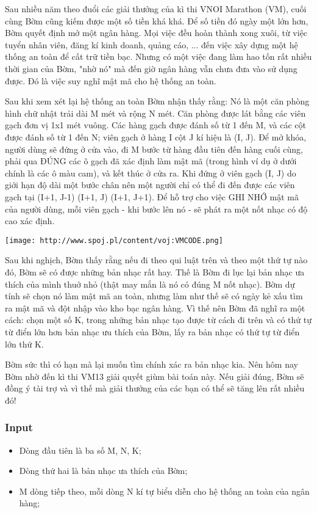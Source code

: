 



   Sau nhiều năm theo đuổi các giải thưởng của kì thi VNOI Marathon (VM), cuối cùng Bờm cũng kiếm được một số tiền khá khá. Để số tiền đó ngày một lớn hơn, Bờm quyết định mở một ngân hàng. Mọi việc đều hoàn thành xong xuôi, từ việc tuyển nhân viên, đăng kí kinh doanh, quảng cáo, ... đến việc xây dựng một hệ thống an toàn để cất trữ tiền bạc. Nhưng có một việc đang làm hao tốn rất nhiều thời gian của Bờm, "nhờ nó" mà đến giờ ngân hàng vẫn chưa đưa vào sử dụng được. Đó là việc suy nghĩ mật mã cho hệ thống an toàn.  

   Sau khi xem xét lại hệ thống an toàn Bờm nhận thấy rằng: Nó là một căn phòng hình chữ nhật trải dài M mét và rộng N mét. Căn phòng được lát bằng các viên gạch đơn vị 1x1 mét vuông. Các hàng gạch được đánh số từ 1 đến M, và các cột được đánh số từ 1 đến N; viên gạch ở hàng I cột J kí hiệu là (I, J). Để mở khóa, người dùng sẽ đứng ở cửa vào, đi M bước từ hàng đầu tiên đến hàng cuối cùng, phải qua ĐÚNG các ô gạch đã xác định làm mật mã (trong hình ví dụ ở dưới chính là các ô màu cam), và kết thúc ở cửa ra. Khi đứng ở viên gạch (I, J) do giới hạn độ dài một bước chân nên một người chỉ có thể đi đến được các viên gạch tại (I+1, J-1) (I+1, J) (I+1, J+1). Để hỗ trợ cho việc GHI NHỚ mật mã của người dùng, mỗi viên gạch - khi bước lên nó - sẽ phát ra một nốt nhạc có độ cao xác định.  


\texttt{[image: http://www.spoj.pl/content/voj:VMCODE.png]}

   Sau khi nghịch, Bờm thấy rằng nếu đi theo qui luật trên và theo một thứ tự nào đó, Bờm sẽ có được những bản nhạc rất hay. Thế là Bờm đi lục lại bản nhạc ưa thích của mình thuở nhỏ (thật may mắn là nó có đúng M nốt nhạc). Bờm dự tính sẽ chọn nó làm mật mã an toàn, nhưng làm như thế sẽ có ngày kẻ xấu tìm ra mật mã và đột nhập vào kho bạc ngân hàng. Vì thế nên Bờm đã nghĩ ra một cách: chọn một số K, trong những bản nhạc tạo được từ cách đi trên và có thứ tự từ điển lớn hơn bản nhạc ưu thích của Bờm, lấy ra bản nhạc có thứ tự từ điển lớn thứ K.  

   Bờm sức thì có hạn mà lại muốn tìm chính xác ra bản nhạc kia. Nên hôm nay Bờm nhờ đến kì thi VM13 giải quyết giùm bài toán này. Nếu giải đúng, Bờm sẽ đồng ý tài trợ và vì thế mà giải thưởng của các bạn có thể sẽ tăng lên rất nhiều đó!  

\subsubsection{   Input  }
\begin{itemize}
	\item     Dòng đầu tiên là ba số M, N, K;   
	\item     Dòng thứ hai là bản nhạc ưa thích của Bờm;   
	\item     M dòng tiếp theo, mỗi dòng N kí tự biểu diễn cho hệ thống an toàn của ngân hàng;   
\end{itemize}


